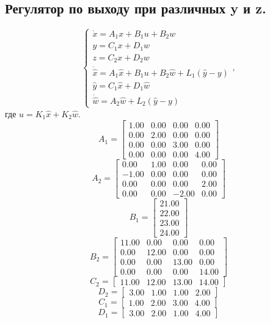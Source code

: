 \subsection{Регулятор по выходу при различных y и z.}

\[
    \begin{cases}
        \dot{x} = A_1x + B_1u + B_2w \\
        y = C_1x + D_1w \\
        z = C_2x + D_2w \\
        \dot{\hat{x}} = A_1\hat{x} + B_1u + B_2\hat{w} + L_1(\hat{y} - y) \\
        \hat{y} = C_1\hat{x} + D_1\hat{w} \\
        \dot{\hat{w}} = A_2\hat{w} + L_2(\hat{y} - y)
    \end{cases},
\]
где $u = K_1\hat{x} + K_2\hat{w}$. 
\[A_1 = \begin{bmatrix}
    1.00 &  0.00 &  0.00 &  0.00\\
    0.00 &  2.00 &  0.00 &  0.00\\
    0.00 &  0.00 &  3.00 &  0.00\\
    0.00 &  0.00 &  0.00 &  4.00
  \end{bmatrix}\]
  \[A_2 = \begin{bmatrix}
    0.00 &  1.00 &  0.00 &  0.00\\
   -1.00 &  0.00 &  0.00 &  0.00\\
    0.00 &  0.00 &  0.00 &  2.00\\
    0.00 &  0.00 & -2.00 &  0.00
  \end{bmatrix}\]
  \[B_1 = \begin{bmatrix}
    21.00\\
    22.00\\
    23.00\\
    24.00
  \end{bmatrix}\]
  \[B_2 = \begin{bmatrix}
    11.00 &  0.00 &  0.00 &  0.00\\
    0.00 &  12.00 &  0.00 &  0.00\\
    0.00 &  0.00 &  13.00 &  0.00\\
    0.00 &  0.00 &  0.00 &  14.00
  \end{bmatrix}\]
  \[C_2 = \begin{bmatrix}
    11.00 &  12.00 &  13.00 &  14.00
  \end{bmatrix}\]
  \[D_2 = \begin{bmatrix}
    3.00 &  1.00 &  1.00 &  2.00
  \end{bmatrix}\]
  \[C_1 = \begin{bmatrix}
    1.00 &  2.00 &  3.00 &  4.00
  \end{bmatrix}\]
  \[D_1 = \begin{bmatrix}
    3.00 &  2.00 &  1.00 &  4.00
  \end{bmatrix}\]
  
